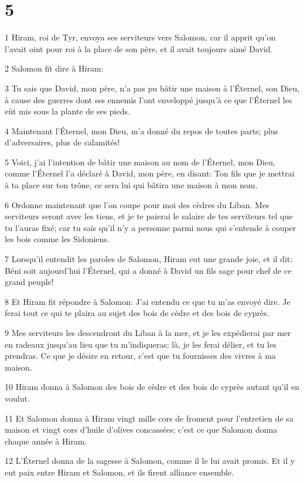 \chapter{5}

\par 1 Hiram, roi de Tyr, envoya ses serviteurs vers Salomon, car il apprit qu'on l'avait oint pour roi à la place de son père, et il avait toujours aimé David.
\par 2 Salomon fit dire à Hiram:
\par 3 Tu sais que David, mon père, n'a pas pu bâtir une maison à l'Éternel, son Dieu, à cause des guerres dont ses ennemis l'ont enveloppé jusqu'à ce que l'Éternel les eût mis sous la plante de ses pieds.
\par 4 Maintenant l'Éternel, mon Dieu, m'a donné du repos de toutes parts; plus d'adversaires, plus de calamités!
\par 5 Voici, j'ai l'intention de bâtir une maison au nom de l'Éternel, mon Dieu, comme l'Éternel l'a déclaré à David, mon père, en disant: Ton fils que je mettrai à ta place sur ton trône, ce sera lui qui bâtira une maison à mon nom.
\par 6 Ordonne maintenant que l'on coupe pour moi des cèdres du Liban. Mes serviteurs seront avec les tiens, et je te paierai le salaire de tes serviteurs tel que tu l'auras fixé; car tu sais qu'il n'y a personne parmi nous qui s'entende à couper les bois comme les Sidoniens.
\par 7 Lorsqu'il entendit les paroles de Salomon, Hiram eut une grande joie, et il dit: Béni soit aujourd'hui l'Éternel, qui a donné à David un fils sage pour chef de ce grand peuple!
\par 8 Et Hiram fit répondre à Salomon: J'ai entendu ce que tu m'as envoyé dire. Je ferai tout ce qui te plaira au sujet des bois de cèdre et des bois de cyprès.
\par 9 Mes serviteurs les descendront du Liban à la mer, et je les expédierai par mer en radeaux jusqu'au lieu que tu m'indiqueras; là, je les ferai délier, et tu les prendras. Ce que je désire en retour, c'est que tu fournisses des vivres à ma maison.
\par 10 Hiram donna à Salomon des bois de cèdre et des bois de cyprès autant qu'il en voulut.
\par 11 Et Salomon donna à Hiram vingt mille cors de froment pour l'entretien de sa maison et vingt cors d'huile d'olives concassées; c'est ce que Salomon donna chaque année à Hiram.
\par 12 L'Éternel donna de la sagesse à Salomon, comme il le lui avait promis. Et il y eut paix entre Hiram et Salomon, et ils firent alliance ensemble.
